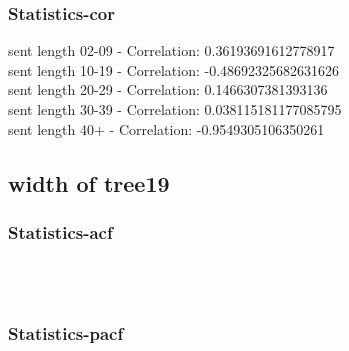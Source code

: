 \documentclass{article}%
\begin{document}
%
\newpage%
\subsubsection{Statistics{-}cor}%
\label{ssubsec:Statistics{-}cor}%
\noindent%
sent length 02-09 - Correlation: 0.36193691612778917\\%
sent length 10-19 - Correlation: -0.48692325682631626\\%
sent length 20-29 - Correlation: 0.1466307381393136\\%
sent length 30-39 - Correlation: 0.038115181177085795\\%
sent length 40+ - Correlation: -0.9549305106350261\\

%
\newpage

%
\subsection{width of tree19}%
\label{subsec:widthoftree19}%
\subsubsection{Statistics{-}acf}%
\label{ssubsec:Statistics{-}acf}%


\begin{figure}[ht]%
\centering%
\setlength{\abovecaptionskip}{-35pt}%
%
%
\\%
%
%
\\%
%
\end{figure}

%
\newpage%
\subsubsection{Statistics{-}pacf}%
\label{ssubsec:Statistics{-}pacf}%
\end{document}
